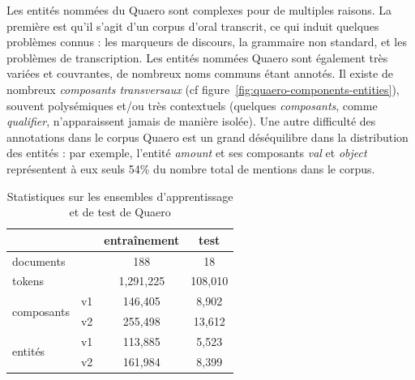 \documentclass[12pt,a4paper,times,twoside,openright]{report}
\begin{document}
Les entités nommées du Quaero sont complexes pour de multiples raisons. La première est qu'il s'agit d'un corpus d'oral transcrit, ce qui induit quelques problèmes connus : les marqueurs de discours, la grammaire non standard, et les problèmes de transcription. Les entités nommées Quaero sont également très variées et couvrantes, de nombreux noms communs étant annotés. Il existe de nombreux \emph{composants transversaux} (cf figure\ \ref{fig:quaero-components-entities}), souvent polysémiques et/ou très contextuels (quelques \emph{composants}, comme \emph{qualifier}, n'apparaissent jamais de manière isolée). Une autre difficulté des annotations dans le corpus Quaero est un grand déséquilibre dans la distribution des entités : par exemple, l'entité \emph{amount} et ses composants \emph{val} et \emph{object} représentent à eux seuls 54\% du nombre total de mentions dans le corpus.

\begin{table}[ht!]
    \centering
    \begin{tabular}{|lc|c|c|}
    \cline{3-4}
    \multicolumn{2}{c|}{}            & entraînement & test \\
    \hline
    \multicolumn{2}{|l|}{documents}  & 188          & 18 \\
    \multicolumn{2}{|l|}{tokens}     & 1,291,225    & 108,010 \\
    \hline
    \multirow{2}{*}{composants} & v1 & 146,405      & 8,902 \\
                                & v2 & 255,498      & 13,612 \\
    \hline
    \multirow{2}{*}{entités}    & v1 & 113,885      & 5,523 \\
                                & v2 & 161,984      & 8,399 \\
    \hline
    \end{tabular}
    \caption{Statistiques sur les ensembles d'apprentissage et de test de Quaero}
    \label{fig:quaero-nombres}
\end{table}
\end{document}
